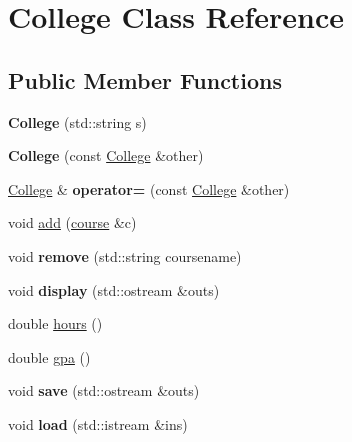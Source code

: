 \hypertarget{classCollege}{}\section{College Class Reference}
\label{classCollege}
\subsection*{Public Member Functions}
\begin{DoxyCompactItemize}
\item 
{\bfseries College} (std\+::string s)\hypertarget{classCollege_adabaf4087355e83f9f7d39f1e1498b41}{}\label{classCollege_adabaf4087355e83f9f7d39f1e1498b41}

\item 
{\bfseries College} (const \hyperlink{classCollege}{College} \&other)\hypertarget{classCollege_ad007ad488e5a7ef986114080d0c8e101}{}\label{classCollege_ad007ad488e5a7ef986114080d0c8e101}

\item 
\hyperlink{classCollege}{College} \& {\bfseries operator=} (const \hyperlink{classCollege}{College} \&other)\hypertarget{classCollege_af2194c9b37f80d13dc3fdba6784b18e8}{}\label{classCollege_af2194c9b37f80d13dc3fdba6784b18e8}

\item 
void \hyperlink{classCollege_a67fd1d8970b46b24ce2e0dd72598a22f}{add} (\hyperlink{classcourse}{course} \&c)
\item 
void {\bfseries remove} (std\+::string coursename)\hypertarget{classCollege_a4d2ae513b36e6421fb1ca2c08459cfe6}{}\label{classCollege_a4d2ae513b36e6421fb1ca2c08459cfe6}

\item 
void {\bfseries display} (std\+::ostream \&outs)\hypertarget{classCollege_a52ca0a164483cf5c05591cd0fb8b300c}{}\label{classCollege_a52ca0a164483cf5c05591cd0fb8b300c}

\item 
double \hyperlink{classCollege_a8a7a762611a1d7e00c453390d49355fd}{hours} ()
\item 
double \hyperlink{classCollege_aaf9bfaa0bc717e96da6365661a96fcd0}{gpa} ()
\item 
void {\bfseries save} (std\+::ostream \&outs)\hypertarget{classCollege_af6b419f813bc990c0e11f99b78a26899}{}\label{classCollege_af6b419f813bc990c0e11f99b78a26899}

\item 
void {\bfseries load} (std\+::istream \&ins)\hypertarget{classCollege_a11422094ddd907705daede7aa537dd73}{}\label{classCollege_a11422094ddd907705daede7aa537dd73}

\end{DoxyCompactItemize}


